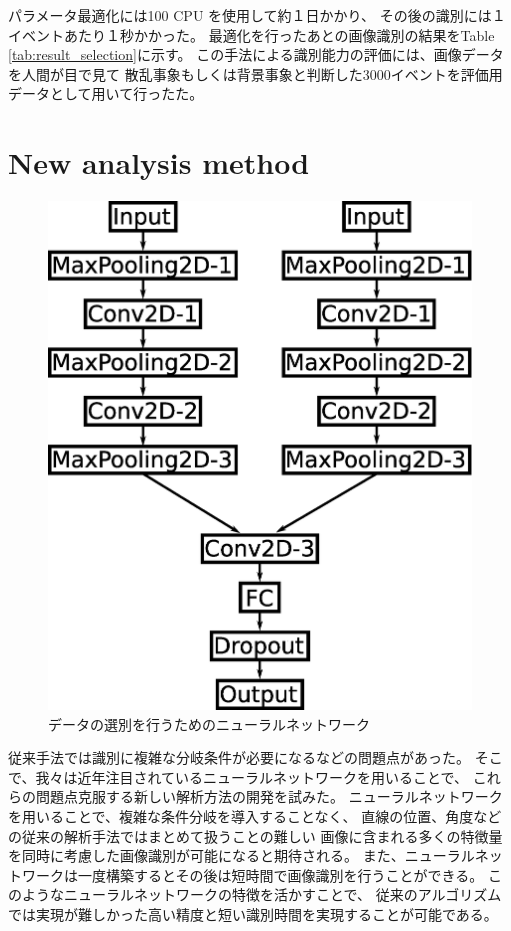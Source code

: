 \documentclass{jps-cp}
\begin{document}
パラメータ最適化には100 CPU を使用して約１日かかり、
その後の識別には１イベントあたり１秒かかった。
最適化を行ったあとの画像識別の結果をTable \ref{tab:result_selection}に示す。
この手法による識別能力の評価には、画像データを人間が目で見て
散乱事象もしくは背景事象と判断した3000イベントを評価用データとして用いて行ったた。

\section{New analysis method}

\begin{figure}
  \centering
  \includegraphics[clip, width=15zw]{eps/event_selection.eps}
  \caption{データの選別を行うためのニューラルネットワーク}
  \label{fig:selection}
\end{figure}

従来手法では識別に複雑な分岐条件が必要になるなどの問題点があった。
そこで、我々は近年注目されているニューラルネットワークを用いることで、
これらの問題点克服する新しい解析方法の開発を試みた。
ニューラルネットワークを用いることで、複雑な条件分岐を導入することなく、
直線の位置、角度などの従来の解析手法ではまとめて扱うことの難しい
画像に含まれる多くの特徴量を同時に考慮した画像識別が可能になると期待される。
また、ニューラルネットワークは一度構築するとその後は短時間で画像識別を行うことができる。
このようなニューラルネットワークの特徴を活かすことで、
従来のアルゴリズムでは実現が難しかった高い精度と短い識別時間を実現することが可能である。
\end{document}

